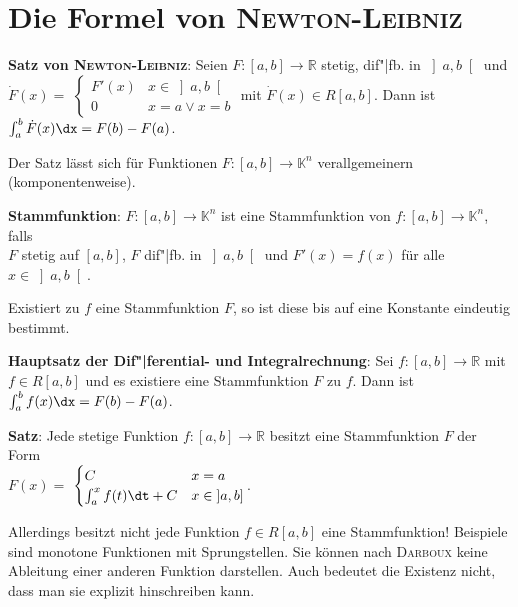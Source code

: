 \pagebreak

\section{%
    Die Formel von \textsc{Newton}-\textsc{Leibniz}%
}

\textbf{Satz von \textsc{Newton}-\textsc{Leibniz}}:
Seien $F: [a,b] \rightarrow \mathbb{R}$ stetig,
dif"|fb. in $\left]a,b\right[$ und \\
$\dot{F}(x) =$ {\footnotesize $\begin{cases}F'(x) & x \in \left]a,b\right[ \\
0 & x = a \lor x = b\end{cases}$} \;mit $\dot{F}(x) \in R[a,b]$. \qquad\qquad
Dann ist $\int_a^b \dot{F}(x)\dx = F(b) - F(a)$.

Der Satz lässt sich für Funktionen $F: [a,b] \rightarrow \mathbb{K}^n$
verallgemeinern (komponentenweise).

\textbf{Stammfunktion}:
$F: [a,b] \rightarrow \mathbb{K}^n$ ist eine Stammfunktion von
$f: [a,b] \rightarrow \mathbb{K}^n$, falls \\
$F$ stetig auf $[a,b]$, \qquad
$F$ dif"|fb. in $\left]a,b\right[$ \qquad und \qquad
$F'(x) = f(x)$ für alle $x \in \left]a,b\right[$.

Existiert zu $f$ eine Stammfunktion $F$, so ist diese bis auf eine Konstante
eindeutig bestimmt.

\textbf{Hauptsatz der Dif"|ferential- und Integralrechnung}:
Sei $f: [a,b] \rightarrow \mathbb{R}$ mit $f \in R[a,b]$ und es existiere
eine Stammfunktion $F$ zu $f$. \qquad\qquad
Dann ist $\int_a^b f(x)\dx = F(b) - F(a)$.

\linie

\textbf{Satz}:
Jede stetige Funktion $f: [a,b] \rightarrow \mathbb{R}$ besitzt eine
Stammfunktion $F$ der Form \\
$F(x) =$ {\footnotesize $\begin{cases}C & x = a \\
\int_a^x f(t)\dt + C & x \in \left]a,b\right]\end{cases}$}.

Allerdings besitzt nicht jede Funktion $f \in R[a,b]$ eine Stammfunktion!
Beispiele sind monotone Funktionen mit Sprungstellen.
Sie können nach \textsc{Darboux} keine Ableitung einer anderen
Funktion darstellen.
Auch bedeutet die Existenz nicht, dass man sie
explizit hinschreiben kann.

\linie

